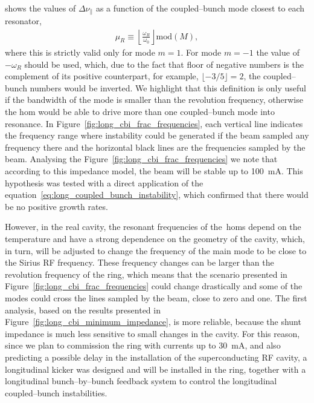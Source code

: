     shows the values of $\Delta\nu_\parallel$ as a function of the coupled--bunch mode closest to each resonator,
    \begin{align}
        \mu_R \equiv \left\lfloor\frac{\omega_R}{\omega_0}\right\rfloor \text{mod}(M),
    \end{align}
    where this is strictly valid only for mode $m=1$. For mode $m=-1$ the value of $-\omega_R$ should be used, which, due to the fact that floor of negative numbers is the complement of its positive counterpart, for example, $\lfloor -3/5 \rfloor=2$, the coupled--bunch numbers would be inverted. We highlight that this definition is only useful if the bandwidth of the mode is smaller than the revolution frequency, otherwise the \gls{hom} would be able to drive more than one coupled--bunch mode into resonance. In Figure~\ref{fig:long_cbi_frac_frequencies}, each vertical line indicates the frequency range where instability could be generated if the beam sampled any frequency there and the horizontal black lines are the frequencies sampled by the beam.
    Analysing the Figure~\ref{fig:long_cbi_frac_frequencies} we note that according to this impedance model, the beam will be stable up to \SI{100}{\milli\ampere}. This hypothesis was tested with a direct application of the equation~\eqref{eq:long_coupled_bunch_instability}, which confirmed that there would be no positive growth rates.

    However, in the real cavity, the resonant frequencies of the~\glspl{hom} depend on the temperature and have a strong dependence on the geometry of the cavity, which, in turn, will be adjusted to change the frequency of the main mode to be close to the Sirius RF frequency. These frequency changes can be larger than the revolution frequency of the ring, which means that the scenario presented in Figure~\ref{fig:long_cbi_frac_frequencies} could change drastically and some of the modes could cross the lines sampled by the beam, close to zero and one. The first analysis, based on the results presented in Figure~\ref{fig:long_cbi_minimum_impedance}, is more reliable, because the shunt impedance is much less sensitive to small changes in the cavity. For this reason, since we plan to commission the ring with currents up to \SI{30}{\milli\ampere}, and also predicting a possible delay in the installation of the superconducting RF cavity, a longitudinal kicker was designed and will be installed in the ring, together with a longitudinal bunch--by--bunch feedback system to control the longitudinal coupled--bunch instabilities.

